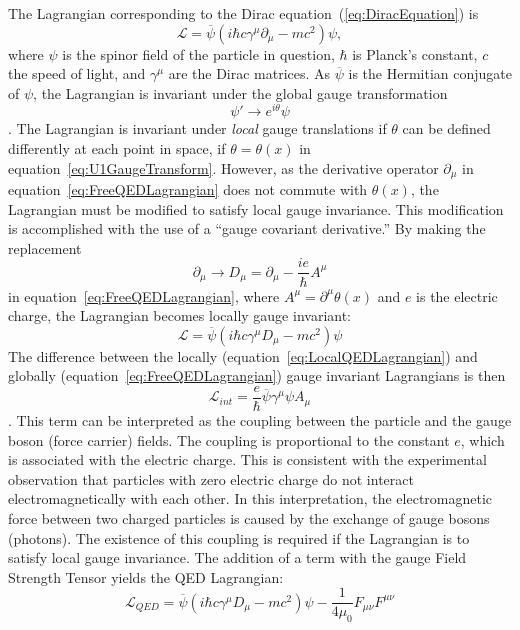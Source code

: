The Lagrangian corresponding to the Dirac equation~(\ref{eq:DiracEquation}) is
\begin{equation}
  \mathcal{L} = \overline \psi (i\hbar c\gamma^\mu \partial_\mu - mc^2) \psi,
  \label{eq:FreeQEDLagrangian}
\end{equation}
where $\psi$ is the spinor field of the particle in question, $\hbar$ is Planck's
constant, $c$ the speed of light, and $\gamma^\mu$ are the Dirac matrices.  As
$\overline\psi$ is the Hermitian conjugate of $\psi$, the Lagrangian is invariant
under the global gauge transformation 
\begin{equation}
  \psi' \to e^{i\theta}\psi
  \label{eq:U1GaugeTransform}
\end{equation}.
The Lagrangian is invariant under \emph{local} gauge translations if $\theta$
can be defined differently at each point in space, \ie if $\theta = \theta(x)$
in equation~\ref{eq:U1GaugeTransform}.  However, as the derivative operator
$\partial_\mu$ in equation~\ref{eq:FreeQEDLagrangian} does not commute with
$\theta(x)$, the Lagrangian must be modified to satisfy local gauge invariance.
This modification is accomplished with the use of a ``gauge covariant
derivative.''  By making the replacement 
\begin{equation} 
  \partial_\mu \to D_\mu = \partial_\mu - \frac{ie}{\hbar}A^\mu      
\end{equation}
in equation~\ref{eq:FreeQEDLagrangian}, where 
$A^\mu = \partial^\mu \theta(x)$ and $e$ is the electric charge, the Lagrangian
becomes locally gauge invariant:
\begin{equation}
  \mathcal{L} = \overline \psi (i\hbar c\gamma^\mu D_\mu - mc^2) \psi 
  \label{eq:LocalQEDLagrangian}
\end{equation}
The difference between
the locally (equation~\ref{eq:LocalQEDLagrangian}) and globally 
(equation~\ref{eq:FreeQEDLagrangian}) gauge invariant Lagrangians is then
\begin{equation}
  \mathcal{L}_{int} = \frac{e}{\hbar}\overline\psi\gamma^\mu\psi A_\mu 
\end{equation}.
This term can be interpreted as the coupling between the particle and the gauge
boson (force carrier) fields.  The coupling is proportional to the constant
$e$, which is associated with the electric charge.  This is consistent with the
experimental observation that particles with zero electric charge do not
interact electromagnetically with each other.  In this interpretation, the
electromagnetic force between two charged particles is caused by the exchange
of gauge bosons (photons).  The existence of this coupling is required if the
Lagrangian is to satisfy local gauge invariance. The addition of a term with
the gauge Field Strength Tensor yields the QED Lagrangian:
\begin{equation}
  \mathcal{L}_{QED} = \overline \psi (i\hbar c\gamma^\mu D_\mu - mc^2) \psi -
  \frac{1}{4\mu_0}F_{\mu\nu}F^{\mu\nu}
\end{equation}

